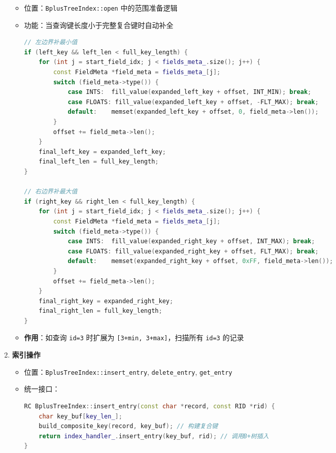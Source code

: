 \documentclass[a4paper, 12pt]{article}
\begin{document}
\begin{enumerate}
\begin{itemize}
        \item 位置：\texttt{BplusTreeIndex::open} 中的范围准备逻辑
        \item 功能：当查询键长度小于完整复合键时自动补全
        \begin{lstlisting}[language=C++]
// 左边界补最小值
if (left_key && left_len < full_key_length) {
    for (int j = start_field_idx; j < fields_meta_.size(); j++) {
        const FieldMeta *field_meta = fields_meta_[j];
        switch (field_meta->type()) {
            case INTS:  fill_value(expanded_left_key + offset, INT_MIN); break;
            case FLOATS: fill_value(expanded_left_key + offset, -FLT_MAX); break;
            default:    memset(expanded_left_key + offset, 0, field_meta->len());
        }
        offset += field_meta->len();
    }
    final_left_key = expanded_left_key;
    final_left_len = full_key_length;
}

// 右边界补最大值
if (right_key && right_len < full_key_length) {
    for (int j = start_field_idx; j < fields_meta_.size(); j++) {
        const FieldMeta *field_meta = fields_meta_[j];
        switch (field_meta->type()) {
            case INTS:  fill_value(expanded_right_key + offset, INT_MAX); break;
            case FLOATS: fill_value(expanded_right_key + offset, FLT_MAX); break;
            default:    memset(expanded_right_key + offset, 0xFF, field_meta->len());
        }
        offset += field_meta->len();
    }
    final_right_key = expanded_right_key;
    final_right_len = full_key_length;
}
        \end{lstlisting}
        \item \textbf{作用}：如查询 \texttt{id=3} 时扩展为 \texttt{[3+min, 3+max]}，扫描所有 \texttt{id=3} 的记录
    \end{itemize}
    
    \item \textbf{索引操作}
    
\begin{itemize}
        \item 位置：\texttt{BplusTreeIndex::insert\_entry}, \texttt{delete\_entry}, \texttt{get\_entry}
        \item 统一接口：
        \begin{lstlisting}[language=C++]
RC BplusTreeIndex::insert_entry(const char *record, const RID *rid) {
    char key_buf[key_len_];
    build_composite_key(record, key_buf); // 构建复合键
    return index_handler_.insert_entry(key_buf, rid); // 调用B+树插入
}


\end{lstlisting}
\end{itemize}
\end{enumerate}
\end{document}
